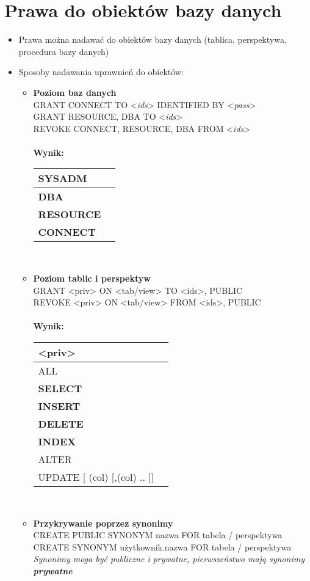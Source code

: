 \documentclass[a4paper,twoside]{article}
\begin{document}
  	\section*{Prawa do obiektów bazy danych}
  	\begin{itemize}
  		\item Prawa można nadawać do obiektów bazy danych (tablica, perspektywa, procedura bazy danych)
  		\item Sposoby nadawania uprawnień do obiektów:
  		\begin{itemize}
  			\item \textbf{Poziom baz danych}\\
  			GRANT CONNECT TO <\emph{ids}> IDENTIFIED BY <\emph{pass}>\\
  			GRANT {RESOURCE, DBA} TO <\emph{ids}>\\
  			REVOKE {CONNECT, 
  				RESOURCE, DBA} FROM  <\emph{ids}>\\\\
  			\textbf{Wynik:}\\
  			\begin{tabular}{|l|l|}
  				\hline
  				SYSADM\\
  				\hline
  				\textbf{DBA}\\
  				\hline
  				\textbf{RESOURCE}\\
  				\hline
  				\textbf{CONNECT}\\
  				\hline
  			\end{tabular}\\
  			\item \textbf{Poziom tablic i perspektyw}\\
  			GRANT  <priv> ON <tab/view> TO {<ids>, PUBLIC}\\
  			REVOKE <priv> ON <tab/view> FROM {<ids>, PUBLIC}\\\\
  			\textbf{Wynik:}\\
  			\begin{tabular}{|l|l|}
  				\hline \textbf{<priv>}\\
  				\hline ALL\\
  				\hline \textbf{SELECT}\\
  				\hline \textbf{INSERT}\\
  				\hline \textbf{DELETE}\\
  				\hline \textbf{INDEX}\\
  				\hline ALTER\\
  				\hline UPDATE [ (col) [,(col) .. ]]\\
  				\hline
  			\end{tabular}\\
  			\item \textbf{Przykrywanie poprzez synonimy}\\
  			CREATE PUBLIC SYNONYM nazwa FOR tabela / perspektywa\\
  			CREATE SYNONYM użytkownik.nazwa FOR tabela / perspektywa\\
  			\emph{Synonimy moga być publiczne i prywatne, pierwszeństwo mają synonimy \textbf{prywatne}}
  			

\end{itemize}
\end{itemize}
\end{document}
